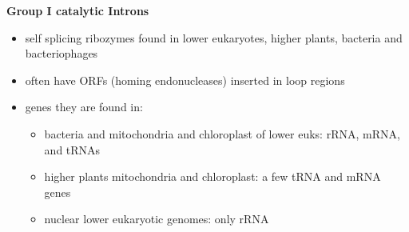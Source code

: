 \documentclass[landscape]{slides}
\begin{document}
\begin{slide}
\begin{center}
\textbf{Group I catalytic Introns}
\end{center}
%
\small
\begin{itemize}
\item self splicing ribozymes found in lower eukaryotes, higher
  plants, bacteria and bacteriophages
\item often have ORFs (homing endonucleases) inserted in loop regions
\item genes they are found in:
\begin {itemize}
\item bacteria and mitochondria and chloroplast of lower euks: rRNA, mRNA, and tRNAs
\item higher plants mitochondria and chloroplast: a few tRNA and mRNA genes
\item nuclear lower eukaryotic genomes: only rRNA
\end{itemize}
\end{itemize}



\vfill
\end{slide}
\end{document}
